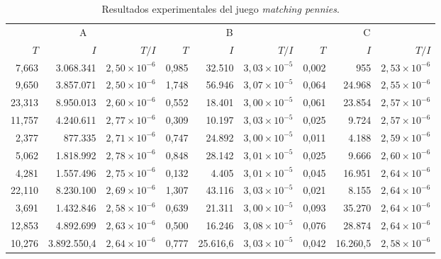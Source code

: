 \begin{table}[h]
    \centering
    \caption{Resultados experimentales del juego \textit{matching pennies}.}
    \label{tab:resultados-matching-pennies}
    \scriptsize
    \begin{tabular}{r r r r r r r r r}
    \toprule
    \multicolumn{3}{c}{A} & \multicolumn{3}{c}{B} & \multicolumn{3}{c}{C} \\ \cmidrule(r){1-3} \cmidrule(lr){4-6} \cmidrule(l){7-9}
    $T$ & $I$ & $T/I$ & $T$ & $I$ & $T/I$ & $T$ & $I$ & $T/I$ \\  \cmidrule(r){1-3} \cmidrule(lr){4-6} \cmidrule(l){7-9}
	 7,663 & 3.068.341   & $2,50 {\times} 10^{-6}$ & 0,985 & 32.510   & $3,03 {\times} 10^{-5}$ & 0,002 &    955   & $2,53 {\times} 10^{-6}$ \\
	 9,650 & 3.857.071   & $2,50 {\times} 10^{-6}$ & 1,748 & 56.946   & $3,07 {\times} 10^{-5}$ & 0,064 & 24.968   & $2,55 {\times} 10^{-6}$ \\
	23,313 & 8.950.013   & $2,60 {\times} 10^{-6}$ & 0,552 & 18.401   & $3,00 {\times} 10^{-5}$ & 0,061 & 23.854   & $2,57 {\times} 10^{-6}$ \\
	11,757 & 4.240.611   & $2,77 {\times} 10^{-6}$ & 0,309 & 10.197   & $3,03 {\times} 10^{-5}$ & 0,025 &  9.724   & $2,57 {\times} 10^{-6}$ \\
	 2,377 &   877.335   & $2,71 {\times} 10^{-6}$ & 0,747 & 24.892   & $3,00 {\times} 10^{-5}$ & 0,011 &  4.188   & $2,59 {\times} 10^{-6}$ \\
	 5,062 & 1.818.992   & $2,78 {\times} 10^{-6}$ & 0,848 & 28.142   & $3,01 {\times} 10^{-5}$ & 0,025 &  9.666   & $2,60 {\times} 10^{-6}$ \\
	 4,281 & 1.557.496   & $2,75 {\times} 10^{-6}$ & 0,132 &  4.405   & $3,01 {\times} 10^{-5}$ & 0,045 & 16.951   & $2,64 {\times} 10^{-6}$ \\
	22,110 & 8.230.100   & $2,69 {\times} 10^{-6}$ & 1,307 & 43.116   & $3,03 {\times} 10^{-5}$ & 0,021 &  8.155   & $2,64 {\times} 10^{-6}$ \\
	 3,691 & 1.432.846   & $2,58 {\times} 10^{-6}$ & 0,639 & 21.311   & $3,00 {\times} 10^{-5}$ & 0,093 & 35.270   & $2,64 {\times} 10^{-6}$ \\
	12,853 & 4.892.699   & $2,63 {\times} 10^{-6}$ & 0,500 & 16.246   & $3,08 {\times} 10^{-5}$ & 0,076 & 28.874   & $2,64 {\times} 10^{-6}$ \\ \cmidrule(r){1-3} \cmidrule(lr){4-6} \cmidrule(l){7-9}
	10,276 & 3.892.550,4 & $2,64 {\times} 10^{-6}$ & 0,777 & 25.616,6 & $3,03 {\times} 10^{-5}$ & 0,042 & 16.260,5 & $2,58 {\times} 10^{-6}$ \\\bottomrule
    \end{tabular}
\end{table}

